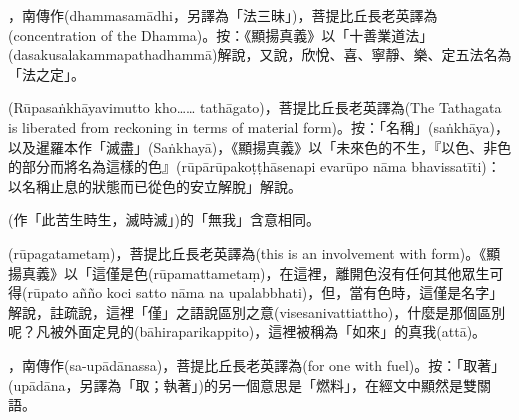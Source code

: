 \startitemgroup[noteitems]
\item{}，南傳作(dhammasamādhi，另譯為「法三昧」)，菩提比丘長老英譯為(concentration of the Dhamma)。按：《顯揚真義》以「十善業道法」(dasakusalakammapathadhammā)解說，又說，欣悅、喜、寧靜、樂、定五法名為「法之定」。
\stopitemgroup

\startitemgroup[noteitems]
\item{}(Rūpasaṅkhāyavimutto kho…… tathāgato)，菩提比丘長老英譯為(The Tathagata is liberated from reckoning in terms of material form)。按：「名稱」(saṅkhāya)，以及暹羅本作「滅盡」(Saṅkhayā)，《顯揚真義》以「未來色的不生，『以色、非色的部分而將名為這樣的色』(rūpārūpakoṭṭhāsenapi evarūpo nāma bhavissatīti)：以名稱止息的狀態而已從色的安立解脫」解說。
\stopitemgroup

\startitemgroup[noteitems]
\item{}(作「此苦生時生，滅時滅」)的「無我」含意相同。
\stopitemgroup

\startitemgroup[noteitems]
\item{}(rūpagatametaṃ)，菩提比丘長老英譯為(this is an involvement with form)。《顯揚真義》以「這僅是色(rūpamattametaṃ)，在這裡，離開色沒有任何其他眾生可得(rūpato añño koci satto nāma na upalabbhati)，但，當有色時，這僅是名字」解說，註疏說，這裡「僅」之語說區別之意(visesanivattiattho)，什麼是那個區別呢？凡被外面定見的(bāhiraparikappito)，這裡被稱為「如來」的真我(attā)。
\stopitemgroup

\startitemgroup[noteitems]
\item{}，南傳作(sa-upādānassa)，菩提比丘長老英譯為(for one with fuel)。按：「取著」(upādāna，另譯為「取；執著」)的另一個意思是「燃料」，在經文中顯然是雙關語。
\stopitemgroup

